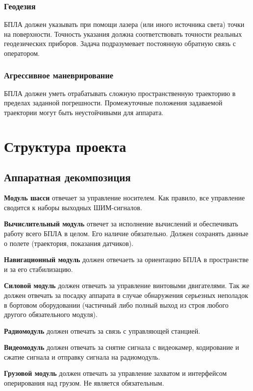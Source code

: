 \documentclass[utf8]{report}
\begin{document}
\subsection{Геодезия}
БПЛА должен указывать при помощи лазера (или иного источника света) точки на поверхности. Точность указания должна соответствовать точности реальных геодезических приборов. Задача подразумевает постоянную обратную связь с оператором.

\subsection{Агрессивное маневрирование}
БПЛА должен уметь отрабатывать сложную пространственную траекторию в пределах заданной погрешности. Промежуточные положения задаваемой траектории могут быть неустойчивыми для аппарата.

\chapter{Структура проекта}

\section{Аппаратная декомпозиция}

\textbf{Модуль шасси} отвечает за управление носителем. Как правило, все управление сводится к наборы выходных ШИМ-сигналов.

\textbf{Вычислительный модуль} отвечет за исполнение вычислений и обеспечивать работу всего БПЛА в целом. Его наличие обязательно. Должен сохранять данные о полете (траектория, показания датчиков).

\textbf{Навигационный модуль} должен отвечаеть за ориентацию БПЛА в пространстве и за его стабилизацию.

\textbf{Силовой модуль} должен отвечать за управление винтовыми двигателями. Так же должен отвечать за посадку аппарата в случае обнаружения серьезных неполадок в бортовом оборудовании (частичный либо полный выход из строя любого другого обязательного модуля).

\textbf{Радиомодуль} должен отвечать за связь с управляющей станцией.

\textbf{Видеомодуль} должен отвечать за снятие сигнала с видеокамер, кодирование и сжатие сигнала и отправку сигнала на радиомодуль.

\textbf{Грузовой модуль} должен отвечать за управление захватом и интерфейсом оперирования над грузом. Не является обязательным.
\end{document}
